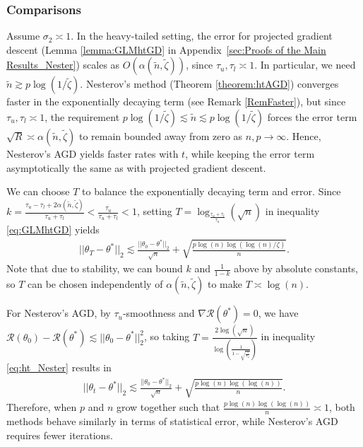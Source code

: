 \documentclass{article}
\begin{document}

\subsubsection{Comparisons}
\label{sec:Comparisons in the Heavy-Tailed Setting}

Assume $\sigma_2 \asymp 1$. In the heavy-tailed setting, the error for projected gradient descent (Lemma \ref{lemma:GLMhtGD} in Appendix~\ref{sec:Proofs of the Main Results_Nester}) scales as $O(\alpha(\widetilde{n}, \widetilde{\zeta}))$, since $\tau_u, \tau_l \asymp 1$. In particular, we need $\widetilde{n} \gtrsim p \log(1/\widetilde{\zeta})$. 
Nesterov’s method (Theorem \ref{theorem:htAGD}) converges faster in the exponentially decaying term (see Remark \ref{RemFaster}), but since $\tau_u, \tau_l \asymp 1$, the requirement $p \log(1/\widetilde{\zeta}) \lesssim \widetilde{n} \lesssim p \log(1/\widetilde{\zeta})$ forces the error term $\sqrt{R} \asymp \alpha(\widetilde{n}, \widetilde{\zeta})$ to remain bounded away from zero as $n, p \rightarrow \infty$. Hence, Nesterov's AGD yields faster rates with $t$, while keeping the error term asymptotically the same as with projected gradient descent.

We can choose $T$ to balance the exponentially decaying term and error. Since $k = \frac{\tau_u - \tau_l + 2\alpha(\widetilde{n}, \widetilde{\zeta})}{\tau_u + \tau_l} < \frac{\tau_u}{\tau_u + \tau_l} < 1$, setting $T = \log_{\frac{\tau_u + \tau_l}{\tau_u}}(\sqrt{n})$ in inequality \eqref{eq:GLMhtGD} yields  
\begin{align}
\label{eq:ht_gdd}
||\theta_T - \theta^*||_2 \lesssim \frac{||\theta_0 - \theta^*||_2}{\sqrt{n}} + \sqrt{\frac{p \log\left(n\right)\log\left(\log\left(n\right)/\zeta\right)}{n}}.
\end{align}
Note that due to stability, we can bound $k$ and $\frac{1}{1 - k}$ above by absolute constants, so $T$ can be chosen independently of $\alpha(\widetilde{n}, \widetilde{\zeta})$ to make $T \asymp \log(n)$.  

For Nesterov's AGD, by $\tau_u$-smoothness and $\nabla\mathcal{R}(\theta^*) = 0$, we have $\mathcal{R}(\theta_0) - \mathcal{R}(\theta^*) \lesssim ||\theta_0 - \theta^*||_2^2$, so taking $T = \frac{2\log(\sqrt{n})}{\log\left(\frac{1}{1 - \sqrt{\frac{\tau_l}{\tau_u}}}\right)}$ in inequality \eqref{eq:ht_Nester} results in 
\begin{align}
\label{eq:ht_Nesterr}
||\theta_t - \theta^*||_2 \lesssim \frac{||\theta_0 - \theta^*||_2}{\sqrt{n}} + \sqrt{\frac{p\log(n)\log(\log(n))}{n}}.
\end{align}
Therefore, when $p$ and $n$ grow together such that $\frac{p\log(n)\log(\log(n))}{n} \asymp 1$, both methods behave similarly in terms of statistical error, while Nesterov's AGD requires fewer iterations.
\end{document}
